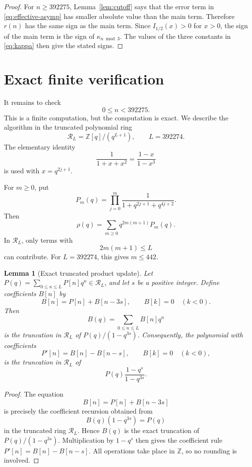 \documentclass[10pt,a4paper]{amsart}
\newtheorem{lemma}[theorem]{Lemma}
\newcommand{\Z}{\mathbb Z}
\begin{document}
\begin{proof}
For $n\geq392275$, Lemma~\ref{lem:cutoff} says that the error term in
\eqref{eq:effective-asymp} has smaller absolute value than the main term.
Therefore $r(n)$ has the same sign as the main term.  Since
$I_{1/2}(x)>0$ for $x>0$, the sign of the main term is the sign of
$\kappa_{n\bmod3}$.  The values of the three constants in \eqref{eq:kappa}
then give the stated signs.
\end{proof}

\section{Exact finite verification}\label{sec:finite-verification}

It remains to check
\[
0\leq n<392275.
\]
This is a finite computation, but the computation is exact.  We describe the
algorithm in the truncated polynomial ring
\[
\mathcal R_L=\Z[q]/(q^{L+1}),
\qquad
L=392274.
\]
The elementary identity
\begin{equation}\label{eq:factor-identity}
\frac1{1+x+x^2}=\frac{1-x}{1-x^3}
\end{equation}
is used with $x=q^{2j+1}$.

For $m\geq0$, put
\[
P_m(q)=\prod_{j=0}^{m}\frac1{1+q^{2j+1}+q^{4j+2}}.
\]
Then
\[
\rho(q)=\sum_{m\geq0}q^{2m(m+1)}P_m(q).
\]
In \(\mathcal R_L\), only terms with
\[
2m(m+1)\leq L
\]
can contribute.  For $L=392274$, this gives $m\leq442$.

\begin{lemma}[Exact truncated product update]\label{lem:truncated-update}
Let $P(q)=\sum_{0\leq n\leq L}P[n]q^n\in\mathcal R_L$, and let $s$ be a
positive integer.  Define coefficients $B[n]$ by
\[
B[n]=P[n]+B[n-3s],
\qquad
B[k]=0\quad(k<0).
\]
Then
\[
B(q)=\sum_{0\leq n\leq L}B[n]q^n
\]
is the truncation in $\mathcal R_L$ of $P(q)/(1-q^{3s})$.  Consequently, the
polynomial with coefficients
\[
P'[n]=B[n]-B[n-s],
\qquad
B[k]=0\quad(k<0),
\]
is the truncation in $\mathcal R_L$ of
\[
P(q)\frac{1-q^s}{1-q^{3s}}.
\]
\end{lemma}

\begin{proof}
The equation
\[
B[n]=P[n]+B[n-3s]
\]
is precisely the coefficient recursion obtained from
\[
B(q)(1-q^{3s})=P(q)
\]
in the truncated ring $\mathcal R_L$.  Hence $B(q)$ is the exact truncation of
$P(q)/(1-q^{3s})$.  Multiplication by $1-q^s$ then gives the coefficient rule
$P'[n]=B[n]-B[n-s]$.  All operations take place in $\Z$, so no rounding is
involved.
\end{proof}
\end{document}
